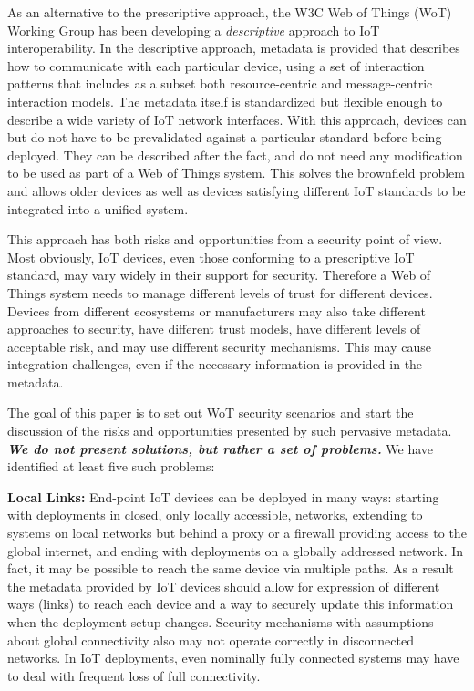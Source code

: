 As an alternative to the prescriptive approach,
the W3C Web of Things (WoT) Working Group has been developing a \emph{descriptive} 
approach to IoT interoperability.
In the descriptive approach,
metadata is provided that describes how to communicate with each particular device,
using a set of interaction patterns that includes as a subset both resource-centric
and message-centric interaction models.
The metadata itself is standardized but flexible enough to describe a wide variety of
IoT network interfaces.
With this approach,
devices can but do not have to be prevalidated against 
a particular standard before being deployed.
They can be described after the fact,
and do not need any modification to be
used as part of a Web of Things system.
This solves the brownfield problem and allows
older devices as well as devices satisfying different IoT 
standards to be integrated into a unified system.  

This approach has both risks and opportunities from a security point of view.
Most obviously, IoT devices, even those conforming to a prescriptive IoT standard,
may vary widely in their support for security.
Therefore a Web of Things system
needs to manage different levels of trust for different devices.
Devices from different ecosystems or manufacturers may also take different approaches to
security, have different trust models, have different levels of acceptable risk,
and may use different security mechanisms. 
This may cause integration challenges, even if the necessary
information is provided in the metadata.

The goal of this paper is to set out WoT security scenarios
and start the discussion of the risks and opportunities presented
by such pervasive metadata.  
\textit{\textbf{We do not present solutions, but rather a set of problems.}}
We have identified at least five such problems:

\noindent\textbf{Local Links:}
End-point IoT devices can be deployed in many ways: 
starting with deployments in closed, only locally accessible,
networks, extending to systems on local networks but behind a proxy or a firewall 
providing access to the global internet, and ending with deployments on a globally addressed network. 
In fact, it may be possible to reach the same device via multiple paths.
As a result the metadata provided by IoT devices should allow for expression of
different ways (links) to reach each device 
and a way to securely update this information when the deployment setup changes. 
Security mechanisms with assumptions about global connectivity also may not
operate correctly in disconnected networks.
In IoT deployments, even nominally fully connected systems may have to 
deal with frequent loss of full connectivity.

